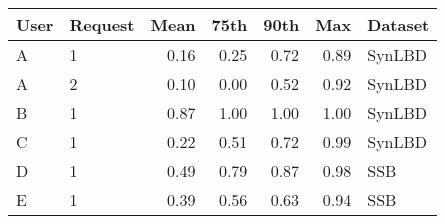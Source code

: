 \begin{tabular}{llrrrrl}
  \hline
User & Request & Mean & 75th & 90th & Max & Dataset \\ 
  \hline
A & 1 & 0.16 & 0.25 & 0.72 & 0.89 & SynLBD \\ 
  A & 2 & 0.10 & 0.00 & 0.52 & 0.92 & SynLBD \\ 
  B & 1 & 0.87 & 1.00 & 1.00 & 1.00 & SynLBD \\ 
  C & 1 & 0.22 & 0.51 & 0.72 & 0.99 & SynLBD \\ 
  D & 1 & 0.49 & 0.79 & 0.87 & 0.98 & SSB \\ 
  E & 1 & 0.39 & 0.56 & 0.63 & 0.94 & SSB \\ 
   \hline
\end{tabular}
